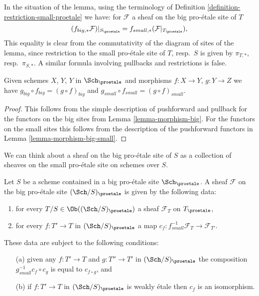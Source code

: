 \noindent
In the situation of the lemma, using the terminology of
Definition \ref{definition-restriction-small-proetale}
we have: for $\mathcal{F}$ a sheaf on the big pro-\'etale site of $T$
$$
(f_{big, *}\mathcal{F})|_{S_\proetale} =
f_{small, *}(\mathcal{F}|_{T_\proetale}),
$$
This equality is clear from the commutativity of the diagram of
sites of the lemma, since restriction to the small pro-\'etale site of
$T$, resp.\ $S$ is given by $\pi_{T, *}$, resp.\ $\pi_{S, *}$. A similar
formula involving pullbacks and restrictions is false.

\begin{lemma}
\label{lemma-composition-proetale}
Given schemes $X$, $Y$, $Y$ in $\Sch_\proetale$
and morphisms $f : X \to Y$, $g : Y \to Z$ we have
$g_{big} \circ f_{big} = (g \circ f)_{big}$ and
$g_{small} \circ f_{small} = (g \circ f)_{small}$.
\end{lemma}

\begin{proof}
This follows from the simple description of pushforward
and pullback for the functors on the big sites from
Lemma \ref{lemma-morphism-big}. For the functors
on the small sites this follows from the description of
the pushforward functors in Lemma \ref{lemma-morphism-big-small}.
\end{proof}

\noindent
We can think about a sheaf on the big pro-\'etale site of $S$ as a collection
of sheaves on the small pro-\'etale site on schemes over $S$.

\begin{lemma}
\label{lemma-characterize-sheaf-big}
Let $S$ be a scheme contained in a big pro-\'etale site $\Sch_\proetale$.
A sheaf $\mathcal{F}$ on the big pro-\'etale site $(\Sch/S)_\proetale$
is given by the following data:
\begin{enumerate}
\item for every $T/S \in \Ob((\Sch/S)_\proetale)$ a sheaf
$\mathcal{F}_T$ on $T_\proetale$,
\item for every $f : T' \to T$ in
$(\Sch/S)_\proetale$ a map
$c_f : f_{small}^{-1}\mathcal{F}_T \to \mathcal{F}_{T'}$.
\end{enumerate}
These data are subject to the following conditions:
\begin{enumerate}
\item[(a)] given any $f : T' \to T$ and $g : T'' \to T'$ in
$(\Sch/S)_\proetale$ the composition
$g_{small}^{-1}c_f \circ c_g$ is equal to $c_{f \circ g}$, and
\item[(b)] if $f : T' \to T$ in $(\Sch/S)_\proetale$
is weakly \'etale then $c_f$ is an isomorphism.
\end{enumerate}
\end{lemma}

